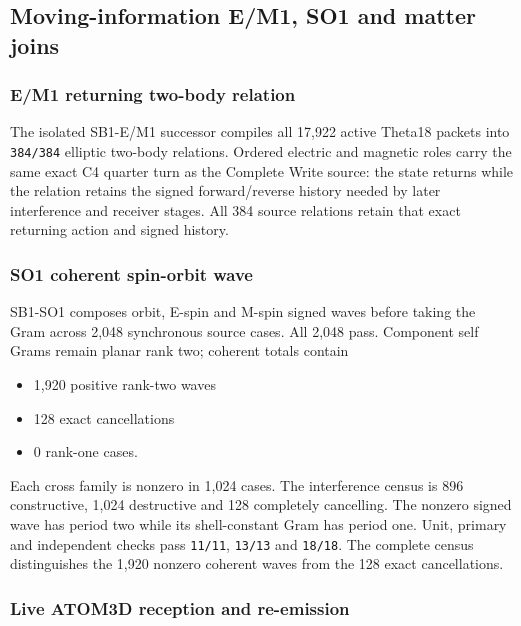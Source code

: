 \subsection{Moving-information E/M1, SO1 and matter
joins}\label{viii-ch08-moving-information-em1-so1-and-matter-joins}

\subsubsection{E/M1 returning two-body
relation}\label{viii-ch08-em1-returning-two-body-relation}

The isolated SB1-E/M1 successor compiles all 17,922 active Theta18
packets into \texttt{384/384} elliptic two-body relations. Ordered
electric and magnetic roles carry the same exact C4 quarter turn as the
Complete Write source: the state returns while the relation retains the
signed forward/reverse history needed by later interference and receiver
stages. All 384 source relations retain that exact returning action and signed history.

\subsubsection{SO1 coherent spin-orbit
wave}\label{viii-ch08-so1-coherent-spin-orbit-wave}

SB1-SO1 composes orbit, E-spin and M-spin signed waves before taking the
Gram across 2,048 synchronous source cases. All 2,048 pass. Component
self Grams remain planar rank two; coherent totals contain

\begin{itemize}
\tightlist
\item
  1,920 positive rank-two waves
\item
  128 exact cancellations
\item
  0 rank-one cases.
\end{itemize}

Each cross family is nonzero in 1,024 cases. The interference census is
896 constructive, 1,024 destructive and 128 completely cancelling. The
nonzero signed wave has period two while its shell-constant Gram has
period one. Unit, primary and independent checks pass \texttt{11/11},
\texttt{13/13} and \texttt{18/18}. The complete census distinguishes the 1,920 nonzero coherent waves from the 128 exact cancellations.

\subsubsection{Live ATOM3D reception and
re-emission}\label{viii-ch08-live-atom3d-reception-and-re-emission}

